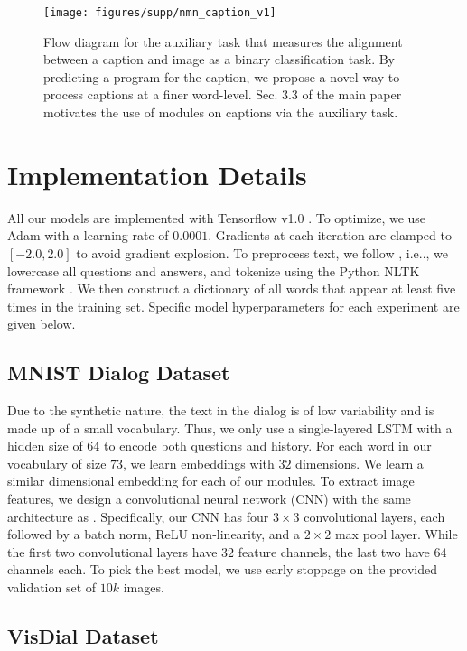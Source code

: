 \documentclass[runningheads]{llncs}
\makeatletter
\DeclareRobustCommand\onedot{\futurelet\@let@token\@onedot}
\def\@onedot{\ifx\@let@token.\else.\null\fi\xspace}
\def\ie{i.e\onedot} \def\Ie{I.e\onedot}
\makeatother
\begin{document}
% 
\begin{figure}
	\centering
    \texttt{[image: figures/supp/nmn\_caption\_v1]}
    \caption{
    Flow diagram for the auxiliary task that measures the alignment between a
    caption and image as a binary classification task.
    By predicting a program for the caption, we propose a novel way to
    process captions at a finer word-level.
    Sec. 3.3 of the main paper motivates the use of modules on 
    captions via the auxiliary task.}
    \label{fig:nmn_caption_supp}
\end{figure} 
\section{Implementation Details}
\label{sup:implement_details}

All our models are implemented with Tensorflow v1.0 
\cite{tensorflow2015-whitepaper}.
To optimize, we use Adam \cite{kingma2014adam} with a learning rate of $0.0001$.
Gradients at each iteration are clamped to $[-2.0, 2.0]$ to avoid gradient explosion.
To preprocess text, we follow \cite{visdial}, \ie, we lowercase all questions 
and answers, and tokenize using the Python NLTK framework \cite{nltk}.
We then construct a dictionary of all words that appear at least five times in
the training set.
Specific model hyperparameters for each experiment are given below.


\subsection{MNIST Dialog Dataset}

Due to the synthetic nature, the text in the dialog is of low variability 
and is made up of a small vocabulary.
Thus, we only use a single-layered LSTM with a hidden size of $64$ to encode 
both questions and history.
For each word in our vocabulary of size $73$, we learn embeddings with $32$
dimensions.
We learn a similar dimensional embedding for each of our modules.
To extract image features, we design a convolutional neural network (CNN) with
the same architecture as \cite{paul2017visual}.
Specifically, our CNN has four $3 \times 3$ convolutional layers, 
each followed by a batch norm, ReLU non-linearity, and a $2 \times 2$ max pool
layer.
While the first two convolutional layers have $32$ feature channels, the last 
two have $64$ channels each.
To pick the best model, we use early stoppage on the provided validation
set of $10k$ images.


\subsection{VisDial Dataset}
\end{document}
